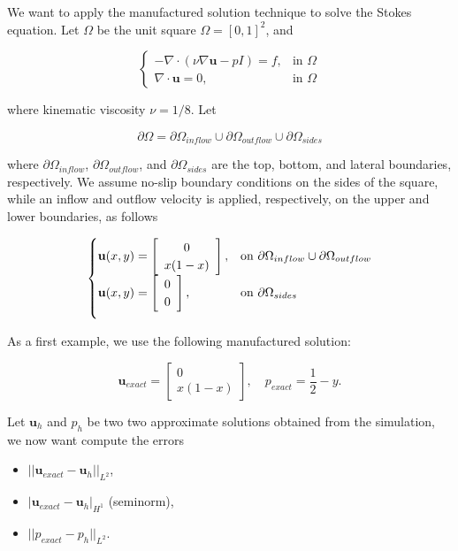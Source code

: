 \documentclass[11pt,a4paper,titlepage]{report}
\begin{document}
We want to apply the manufactured solution technique to solve the Stokes equation. Let $\Omega$ be the unit square $\Omega = [0,1]^2$, and 

\vspace{0.2cm}
\[
\begin{cases}
- \nabla \cdot (\nu \nabla \mathbf{u} - pI) = f, & \mbox{in } \Omega \\
\nabla \cdot \mathbf{u} = 0, & \mbox{in } \Omega
\end{cases}
\]
\vspace{0.2cm}

where kinematic viscosity $\nu = 1/8$. Let 

\[
\partial \Omega = \partial \Omega_{inflow} \cup \partial \Omega_{outflow} \cup \partial \Omega_{sides}
\]

where $\partial \Omega_{inflow}$, $\partial \Omega_{outflow}$, and $\partial \Omega_{sides}$ are the top, bottom, and lateral boundaries, respectively. We assume no-slip boundary conditions on the sides of the square, while an inflow and outflow velocity is applied, respectively, on the upper and lower boundaries, as follows

\[
\begin{cases}
\mathbf{u}(x,y) = \left[ \begin{array}{c} 0 \\ x(1-x) \end{array} \right] , & \mbox{on } \partial \Omega_{inflow} \cup \partial \Omega_{outflow} \\

\vspace{.2cm}

\mathbf{u}(x,y) = \left[ \begin{array}{c} 0 \\ 0 \end{array} \right], & \mbox{on } \partial \Omega_{sides}
\end{cases}
\]

As a first example, we use the following manufactured solution:

\[
\mathbf{u}_{exact} = \left[ \begin{array}{c} 0 \\ x(1-x) \end{array} \right], \quad 
p_{exact} = \frac{1}{2}-y.
\]

Let $\mathbf{u}_h$ and $p_h$ be two two approximate solutions obtained from the simulation, we now want compute the errors

\begin{itemize}
\item $|| \mathbf{u}_{exact} - \mathbf{u}_h ||_{L^2}$,
\item $ | \mathbf{u}_{exact} - \mathbf{u}_h |_{H^1}$ (seminorm),
\item $|| p_{exact} - p_h ||_{L^2} $.
\end{itemize}
\end{document}
